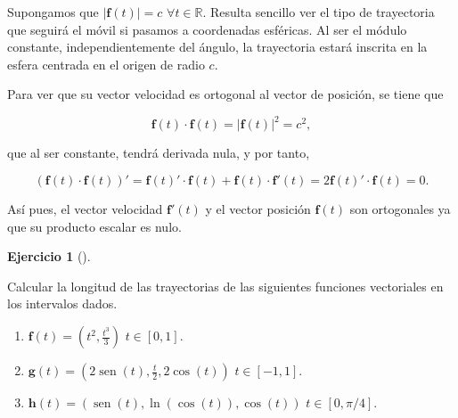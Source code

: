 \documentclass[
  spanish,
  a4paper,
]{scrreport}
\theoremstyle{definition}
\newtheorem{exercise}{Ejercicio}[chapter]
\theoremstyle{remark}
\begin{document}
\begin{tcolorbox}[enhanced jigsaw, arc=.35mm, bottomrule=.15mm, bottomtitle=1mm, breakable, colback=white, colbacktitle=quarto-callout-tip-color!10!white, colframe=quarto-callout-tip-color-frame, coltitle=black, left=2mm, leftrule=.75mm, opacityback=0, opacitybacktitle=0.6, rightrule=.15mm, title=\textcolor{quarto-callout-tip-color}{\faLightbulb}\hspace{0.5em}{Solución}, titlerule=0mm, toprule=.15mm, toptitle=1mm]

Supongamos que \(|\mathbf{f}(t)|=c\) \(\forall t\in \mathbb{R}\).
Resulta sencillo ver el tipo de trayectoria que seguirá el móvil si
pasamos a coordenadas esféricas. Al ser el módulo constante,
independientemente del ángulo, la trayectoria estará inscrita en la
esfera centrada en el origen de radio \(c\).

Para ver que su vector velocidad es ortogonal al vector de posición, se
tiene que

\[
\mathbf{f}(t)\cdot \mathbf{f}(t) = |\mathbf{f}(t)|^2 = c^2,
\]

que al ser constante, tendrá derivada nula, y por tanto,

\[
(\mathbf{f}(t)\cdot \mathbf{f}(t))' = \mathbf{f}(t)'\cdot \mathbf{f}(t) + \mathbf{f}(t)\cdot \mathbf{f}'(t) = 2 \mathbf{f}(t)'\cdot \mathbf{f}(t) = 0.
\]

Así pues, el vector velocidad \(\mathbf{f}'(t)\) y el vector posición
\(\mathbf{f}(t)\) son ortogonales ya que su producto escalar es nulo.

\end{tcolorbox}

\begin{exercise}[]\protect\hypertarget{exr-longitud-trayectoria-1}{}\label{exr-longitud-trayectoria-1}

Calcular la longitud de las trayectorias de las siguientes funciones
vectoriales en los intervalos dados.

\begin{enumerate}
\def\labelenumi{\alph{enumi}.}
\item
  \(\mathbf{f}(t) = (t^2, \frac{t^3}{3})\) \(t\in[0,1]\).
\item
  \(\mathbf{g}(t) = (2\operatorname{sen}(t), \frac{t}{2}, 2\cos(t))\)
  \(t\in [-1, 1]\).
\item
  \(\mathbf{h}(t) = (\operatorname{sen}(t), \ln(\cos(t)), \cos(t))\)
  \(t\in[0,\pi/4]\).
\end{enumerate}

\end{exercise}
\end{document}
